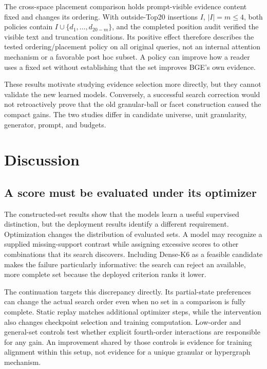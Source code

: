 \documentclass[pdflatex,sn-mathphys-num]{sn-jnl}
\begin{document}
The cross-space placement comparison holds prompt-visible evidence content
fixed and changes its ordering. With outside-Top20 insertions $I$, $|I|=m\leq4$,
both policies contain $I\cup\{d_1,\ldots,d_{20-m}\}$, and the completed
position audit verified the visible text and truncation conditions. Its
positive effect therefore describes the tested ordering/placement policy
on all original queries, not an internal attention mechanism or a favorable
post hoc subset. A policy can improve how a reader uses a fixed set without
establishing that the set improves BGE's own evidence.

These results motivate studying evidence selection more directly, but they
cannot validate the new learned models. Conversely, a successful search
correction would not retroactively prove that the old granular-ball or
facet construction caused the compact gains. The two studies differ in
candidate universe, unit granularity, generator, prompt, and budgets.

\section{Discussion}
\subsection{A score must be evaluated under its optimizer}
The constructed-set results show that the models learn a useful supervised
distinction, but the deployment results identify a different requirement.
Optimization changes the distribution of evaluated sets. A model may
recognize a supplied missing-support contrast while assigning excessive
scores to other combinations that its search discovers. Including Dense-K6
as a feasible candidate makes the failure particularly informative: the
search can reject an available, more complete set because the deployed
criterion ranks it lower.

The continuation targets this discrepancy directly. Its partial-state
preferences can change the actual search order even when no set in a
comparison is fully complete. Static replay matches additional optimizer
steps, while the intervention also changes checkpoint selection and training
computation. Low-order and general-set controls
test whether explicit fourth-order interactions are responsible for any
gain. An improvement shared by those controls is evidence for training
alignment within this setup, not evidence for a unique granular or
hypergraph mechanism.
\end{document}
